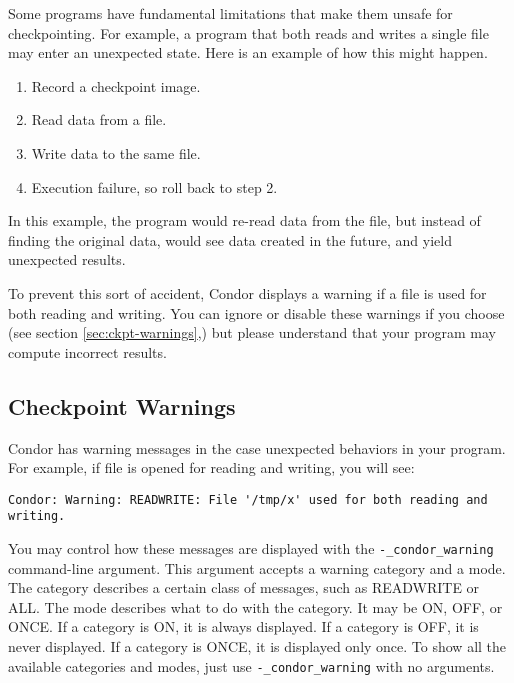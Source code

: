 Some programs have fundamental limitations that make them
unsafe for checkpointing.  For example, a program that both reads
and writes a single file may enter an unexpected state. Here
is an example of how this might happen.

\begin{enumerate}
\item Record a checkpoint image.
\item Read data from a file.
\item Write data to the same file.
\item Execution failure, so roll back to step 2.
\end{enumerate}

In this example, the program would re-read data from the file, but
instead of finding the original data, would see data created in the
future, and yield unexpected results.

To prevent this sort of accident, Condor displays a warning
if a file is used for both reading and writing.  You can ignore or disable
these warnings if you choose (see section \ref{sec:ckpt-warnings},) but
please understand that your program may compute incorrect results.

\subsection{\label{sec:ckpt-warnings}Checkpoint Warnings}

Condor has warning messages in the case unexpected
behaviors in your program.  For example, if file 
is opened for reading
and writing, you will see:

\footnotesize
\begin{verbatim}
Condor: Warning: READWRITE: File '/tmp/x' used for both reading and writing.
\end{verbatim}
\normalsize

You may control how these messages are displayed with the
\verb$-_condor_warning$ command-line argument.  This argument
accepts a warning category and a mode.  The category describes a certain
class of messages, such as READWRITE or ALL.  The mode describes what
to do with the category.  It may be ON, OFF, or ONCE.
If a category is ON, it is always displayed.
If a category is OFF, it is never displayed.
If a category is ONCE, it is displayed only once.
To show all the available categories and modes, just use
\verb$-_condor_warning$ with no arguments.

